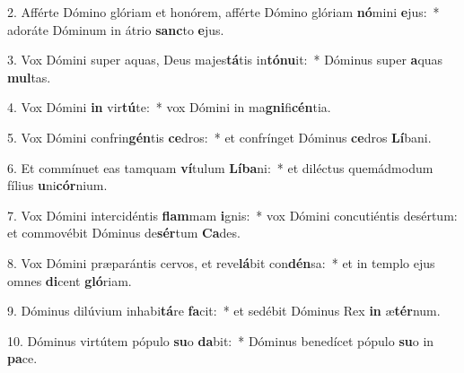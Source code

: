 2. Afférte Dómino glóriam et honórem, afférte Dómino glóriam \textbf{nó}mini \textbf{e}jus:~*  adoráte Dóminum in átrio \textbf{sanc}to \textbf{e}jus.\

3. Vox Dómini super aquas, Deus majes\textbf{tá}tis in\textbf{tó}\textbf{nu}it:~*  Dóminus super \textbf{a}quas \textbf{mul}tas.\

4. Vox Dómini \textbf{in} vir\textbf{tú}te:~*  vox Dómini in ma\textbf{gni}fi\textbf{cén}tia.\

5. Vox Dómini confrin\textbf{gén}tis \textbf{ce}dros:~*  et confrínget Dóminus \textbf{ce}dros \textbf{Lí}bani.\

6. Et commínuet eas tamquam \textbf{ví}tulum \textbf{Lí}\textbf{ba}ni:~*  et diléctus quemádmodum fílius \textbf{u}ni\textbf{cór}nium.\

7. Vox Dómini intercidéntis \textbf{flam}mam \textbf{i}gnis:~*  vox Dómini concutiéntis desértum: et commovébit Dóminus de\textbf{sér}tum \textbf{Ca}des.\

8. Vox Dómini præparántis cervos, et reve\textbf{lá}bit con\textbf{dén}sa:~*  et in templo ejus omnes \textbf{di}cent \textbf{gló}riam.\

9. Dóminus dilúvium inhabi\textbf{tá}re \textbf{fa}cit:~*  et sedébit Dóminus Rex \textbf{in} æ\textbf{tér}num.\

10. Dóminus virtútem pópulo \textbf{su}o \textbf{da}bit:~*  Dóminus benedícet pópulo \textbf{su}o in \textbf{pa}ce.\

